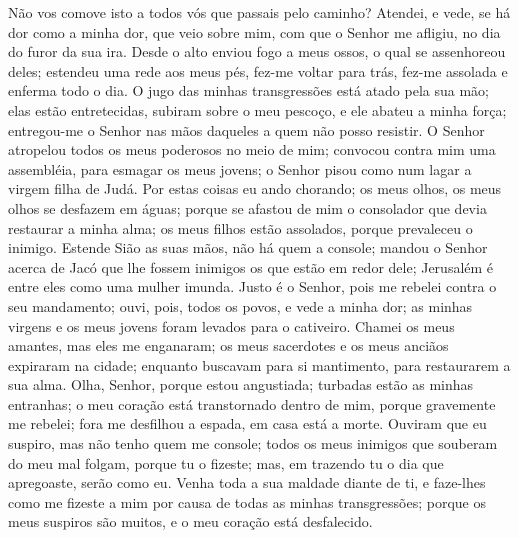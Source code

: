 Não vos comove isto a todos vós que passais pelo caminho?
Atendei, e vede, se há dor como a minha dor, que veio sobre mim, com
que o Senhor  me afligiu, no dia do furor da sua ira. Desde o
alto enviou fogo a meus ossos, o qual se assenhoreou deles; estendeu
uma rede aos meus pés, fez-me voltar para trás, fez-me assolada e
enferma todo o dia. O jugo das minhas transgressões está
atado pela sua mão; elas estão entretecidas, subiram sobre o meu
pescoço, e ele abateu a minha força; entregou-me o Senhor nas mãos
daqueles a quem não posso resistir. O Senhor atropelou todos
os meus poderosos no meio de mim; convocou contra mim uma
assembléia, para esmagar os meus jovens; o Senhor pisou como num
lagar a virgem filha de Judá. Por estas coisas eu ando
chorando; os meus olhos, os meus olhos se desfazem em águas; porque
se afastou de mim o consolador que devia restaurar a minha alma; os
meus filhos estão assolados, porque prevaleceu o inimigo.
Estende Sião as suas mãos, não há quem a console; mandou o
Senhor acerca de Jacó que lhe fossem inimigos os que estão em redor
dele; Jerusalém é entre eles como uma mulher imunda. Justo é
o Senhor, pois me rebelei contra o seu mandamento; ouvi, pois, todos
os povos, e vede a minha dor; as minhas virgens e os meus jovens
foram levados para o cativeiro. Chamei os meus amantes, mas
eles me enganaram; os meus sacerdotes e os meus anciãos expiraram na
cidade; enquanto buscavam para si mantimento, para restaurarem a sua
alma. Olha, Senhor, porque estou angustiada; turbadas estão
as minhas entranhas; o meu coração está transtornado dentro de mim,
porque gravemente me rebelei; fora me desfilhou a espada, em casa
está a morte. Ouviram que eu suspiro, mas não tenho quem me
console; todos os meus inimigos que souberam do meu mal folgam,
porque tu o fizeste; mas, em trazendo tu o dia que apregoaste, serão
como eu. Venha toda a sua maldade diante de ti, e faze-lhes
como me fizeste a mim por causa de todas as minhas transgressões;
porque os meus suspiros são muitos, e o meu coração está
desfalecido.

\medskip

